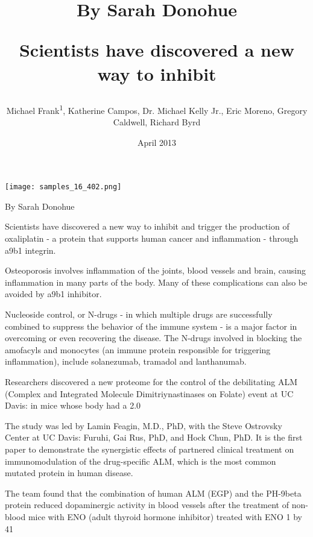 \documentclass{article}
\title{By Sarah Donohue

Scientists have discovered a new way to inhibit}
\author{Michael Frank\textsuperscript{1},  Katherine Campos,  Dr. Michael Kelly Jr.,  Eric Moreno,  Gregory Caldwell,  Richard Byrd}
\affil{\textsuperscript{1}Universiti Sains Malaysia}
\date{April 2013}
\begin{document}
\maketitle

\begin{center}
\begin{minipage}{0.75\linewidth}
\texttt{[image: samples\_16\_402.png]}
\end{minipage}
\end{center}

By Sarah Donohue

Scientists have discovered a new way to inhibit and trigger the production of oxaliplatin - a protein that supports human cancer and inflammation - through a9b1 integrin.

Osteoporosis involves inflammation of the joints, blood vessels and brain, causing inflammation in many parts of the body. Many of these complications can also be avoided by a9b1 inhibitor.

Nucleoside control, or N-drugs - in which multiple drugs are successfully combined to suppress the behavior of the immune system - is a major factor in overcoming or even recovering the disease. The N-drugs involved in blocking the amofacyls and monocytes (an immune protein responsible for triggering inflammation), include solanezumab, tramadol and lanthanumab.

Researchers discovered a new proteome for the control of the debilitating ALM (Complex and Integrated Molecule Dimitriynastinases on Folate) event at UC Davis: in mice whose body had a 2.0%

The study was led by Lamin Feagin, M.D., PhD, with the Steve Ostrovsky Center at UC Davis: Furuhi, Gai Rus, PhD, and Hock Chun, PhD. It is the first paper to demonstrate the synergistic effects of partnered clinical treatment on immunomodulation of the drug-specific ALM, which is the most common mutated protein in human disease.

The team found that the combination of human ALM (EGP) and the PH-9beta protein reduced dopaminergic activity in blood vessels after the treatment of non-blood mice with ENO (adult thyroid hormone inhibitor) treated with ENO 1 by 41%
\end{document}
